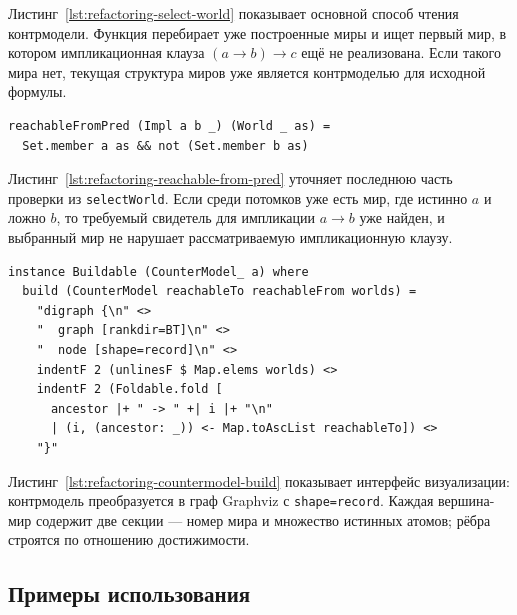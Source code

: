 \documentclass[14pt, russian]{scrartcl}
\begin{document}
Листинг~\ref{lst:refactoring-select-world} показывает основной способ чтения
контрмодели. Функция перебирает уже построенные миры и ищет первый мир, в
котором импликационная клауза $(a \rightarrow b) \rightarrow c$ ещё не
реализована. Если такого мира нет, текущая структура миров уже является
контрмоделью для исходной формулы.

\begin{listing}[!htb]
\caption{Предикат для потомков выбранного мира}
\label{lst:refactoring-reachable-from-pred}
\begin{verbatim}
reachableFromPred (Impl a b _) (World _ as) =
  Set.member a as && not (Set.member b as)
\end{verbatim}
\end{listing}

Листинг~\ref{lst:refactoring-reachable-from-pred} уточняет последнюю часть
проверки из \texttt{selectWorld}. Если среди потомков уже есть мир, где истинно
$a$ и ложно $b$, то требуемый свидетель для импликации $a \rightarrow b$ уже
найден, и выбранный мир не нарушает рассматриваемую импликационную клаузу.

\begin{listing}[!htb]
\caption{Вывод контрмодели в формате DOT}
\label{lst:refactoring-countermodel-build}
\begin{verbatim}
instance Buildable (CounterModel_ a) where
  build (CounterModel reachableTo reachableFrom worlds) = 
    "digraph {\n" <>
    "  graph [rankdir=BT]\n" <>
    "  node [shape=record]\n" <>
    indentF 2 (unlinesF $ Map.elems worlds) <>
    indentF 2 (Foldable.fold [
      ancestor |+ " -> " +| i |+ "\n"
      | (i, (ancestor: _)) <- Map.toAscList reachableTo]) <>
    "}"
\end{verbatim}
\end{listing}

Листинг~\ref{lst:refactoring-countermodel-build} показывает интерфейс
визуализации: контрмодель преобразуется в граф Graphviz с \texttt{shape=record}.
Каждая вершина-мир содержит две секции --- номер мира и множество истинных
атомов; рёбра строятся по отношению достижимости.

\subsection{Примеры использования}
\end{document}
